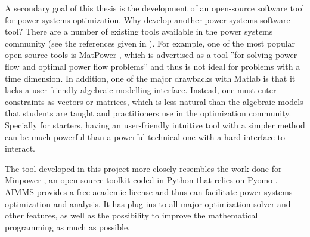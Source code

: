 \documentclass[12pt,LUDisStyle,twosided]{book}
\begin{document}
A secondary goal of this thesis is the development of an open-source software tool for power systems optimization. Why develop another power systems software tool? 
There are a number of existing tools available in the power systems community (see the references given in \cite{greenhall:2012}). For example, one of the most popular open-source tools is MatPower \cite{matpower:2011}, which is advertised as a tool ''for solving power flow and optimal power flow problems'' and thus is not ideal for problems with a time dimension.  In addition, one of the major drawbacks with Matlab is that it lacks a user-friendly algebraic modelling interface.  Instead, one must enter constraints as vectors or matrices, which is less natural than the algebraic models that students are taught and practitioners use in the optimization community. Specially for starters, having an user-friendly intuitive tool with a simpler method can be much powerful than a powerful technical one with a hard interface to interact.

The tool developed in this project more closely resembles the work done for Minpower \cite{greenhall:2012},
an open-source toolkit coded in Python that relies on Pyomo \cite{pyomo:2012}. AIMMS provides a free academic license and thus can facilitate power systems optimization and analysis.
It has plug-ins to all major optimization solver and other features, as well as the possibility to improve the mathematical programming as much as possible.

\end{document}
